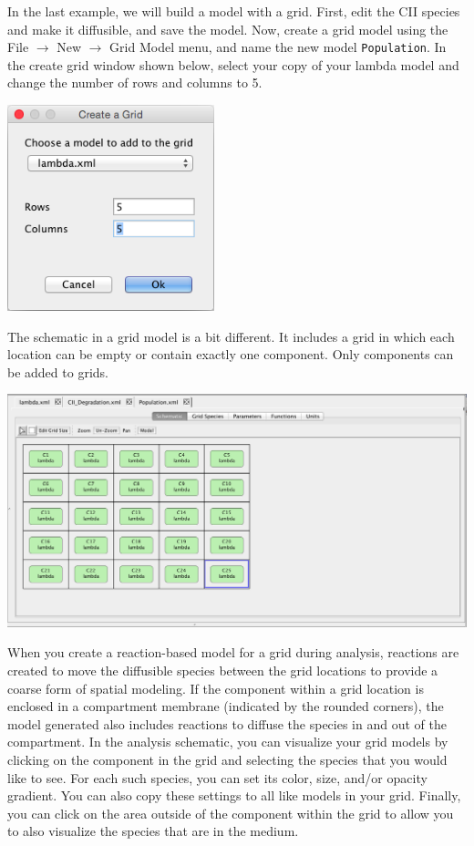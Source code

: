 \documentclass[titlepage,11pt]{article}
\begin{document}
In the last example, we will build a model with a grid. First, edit the CII species and make it diffusible, and save the model.  Now, create a grid model using the File $\rightarrow$ New $\rightarrow$ Grid Model menu, and name the new model {\tt Population}.  In the create grid window shown below, select your copy of your lambda model and change the number of rows and columns to 5.  

\begin{center}
\includegraphics[width=60mm]{screenshots/createGrid}
\end{center}

The schematic in a grid model is a bit different.  It includes a grid in which each location can be empty or contain exactly one component.  Only components can be added to grids.

\begin{center}
\includegraphics[width=160mm]{screenshots/gridModel}
\end{center}

When you create a reaction-based model for a grid during analysis, reactions are created to move the diffusible species between the grid locations to provide a coarse form of spatial modeling.  If the component within a grid location is enclosed in a compartment membrane (indicated by the rounded corners), the model generated also includes reactions to diffuse the species in and out of the compartment.  In the analysis schematic, you can visualize your grid models by clicking on the component in the grid and selecting the species that you would like to see.  For each such species, you can set its color, size, and/or opacity gradient.  You can also copy these settings to all like models in your grid.  Finally, you can click on the area outside of the component within the grid to allow you to also visualize the species that are in the medium.
\end{document}
